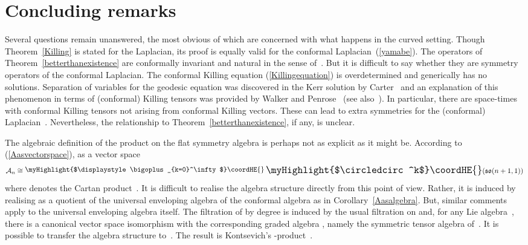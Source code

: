 \documentclass[a4paper,12pt]{amsart}
\providecommand{\topten}{\circledcirc}
\begin{document}
\section{Concluding remarks}\label{discuss}
Several questions remain unanswered, the most obvious of which are concerned
with what happens in the curved setting. Though Theorem~\ref{Killing} is stated
for the Laplacian, its proof is equally valid for the conformal
Laplacian~(\ref{yamabe}). The operators of Theorem~\ref{betterthanexistence}
are conformally invariant and natural in the sense of~\cite{kms}. But it is
difficult to say whether they are symmetry operators of the conformal
Laplacian. The conformal Killing equation (\ref{Killingequation}) is
overdetermined and generically has no solutions. Separation of variables for
the geodesic equation was discovered in the Kerr solution by Carter~\cite{car}
and an explanation of this phenomenon in terms of (conformal) Killing tensors
was provided by Walker and Penrose~\cite{wp} (see also~\cite{wo}). In
particular, there are space-times with conformal Killing tensors not arising
from conformal Killing vectors. These can lead to extra symmetries for the
(conformal) Laplacian~\cite{km}. Nevertheless, the relationship to
Theorem~\ref{betterthanexistence}, if any, is unclear.

The algebraic definition of the product on the flat symmetry algebra
\coordHE{} is perhaps not as explicit as it might be. According to
(\ref{Aasvectorspace}), as a vector space
$${\mathcal A}_n\cong\raisebox{2pt}{\myHighlight{$\displaystyle\bigoplus_{k=0}^\infty$}\coordHE{}}
\:\mbox{\Large\myHighlight{$\topten^k$}\coordHE{}}({\mathfrak{so}}(n+1,1))$$
where \mbox{\large\myHighlight{$\topten$}\coordHE{}} denotes the Cartan product~\cite{d}. It is
difficult to realise the algebra structure directly from this point of view.
Rather, it is induced by realising \coordHE{} as a quotient of the
universal enveloping algebra of the conformal algebra as in
Corollary~\ref{Aasalgebra}. But, similar comments apply to the universal
enveloping algebra itself. The filtration of \coordHE{} by degree is
induced by the usual filtration on \coordHE{} and,
for any Lie algebra~\coordHE{}, there is a canonical vector space
isomorphism with the corresponding graded algebra
\coordHE{}, namely the
symmetric tensor algebra of~\coordHE{}. It is possible to transfer the
algebra structure to~\coordHE{}. The result is Kontsevich's
\myHighlight{$\star$}\coordHE{}-product~\cite{ads,kon}.
\end{document}
